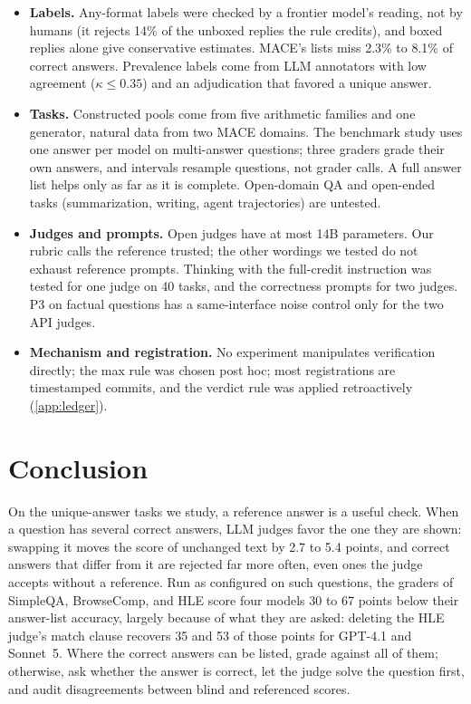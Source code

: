 \documentclass{article}
\begin{document}
\begin{itemize}[leftmargin=1.2em,itemsep=1pt,topsep=2pt]
\item \textbf{Labels.} Any-format labels were checked by a frontier model's reading, not by humans (it rejects 14\% of the unboxed replies the rule credits), and boxed replies alone give conservative estimates. \textsc{MACE}'s lists miss 2.3\% to 8.1\% of correct answers. Prevalence labels come from LLM annotators with low agreement ($\kappa \le 0.35$) and an adjudication that favored a unique answer.
\item \textbf{Tasks.} Constructed pools come from five arithmetic families and one generator, natural data from two \textsc{MACE} domains. The benchmark study uses one answer per model on multi-answer questions; three graders grade their own answers, and intervals resample questions, not grader calls. A full answer list helps only as far as it is complete. Open-domain QA and open-ended tasks (summarization, writing, agent trajectories) are untested.
\item \textbf{Judges and prompts.} Open judges have at most 14B parameters. Our rubric calls the reference trusted; the other wordings we tested do not exhaust reference prompts. Thinking with the full-credit instruction was tested for one judge on 40 tasks, and the correctness prompts for two judges. P3 on factual questions has a same-interface noise control only for the two API judges.
\item \textbf{Mechanism and registration.} No experiment manipulates verification directly; the max rule was chosen post hoc; most registrations are timestamped commits, and the verdict rule was applied retroactively (\cref{app:ledger}).
\end{itemize}

\section{Conclusion}
\label{sec:conclusion}

On the unique-answer tasks we study, a reference answer is a useful check.
When a question has several correct answers, LLM judges favor the one they are shown: swapping it moves the score of unchanged text by 2.7 to 5.4 points, and correct answers that differ from it are rejected far more often, even ones the judge accepts without a reference.
Run as configured on such questions, the graders of SimpleQA, BrowseComp, and HLE score four models 30 to 67 points below their answer-list accuracy, largely because of what they are asked: deleting the HLE judge's match clause recovers 35 and 53 of those points for GPT-4.1 and Sonnet~5.
Where the correct answers can be listed, grade against all of them; otherwise, ask whether the answer is correct, let the judge solve the question first, and audit disagreements between blind and referenced scores.
\end{document}
